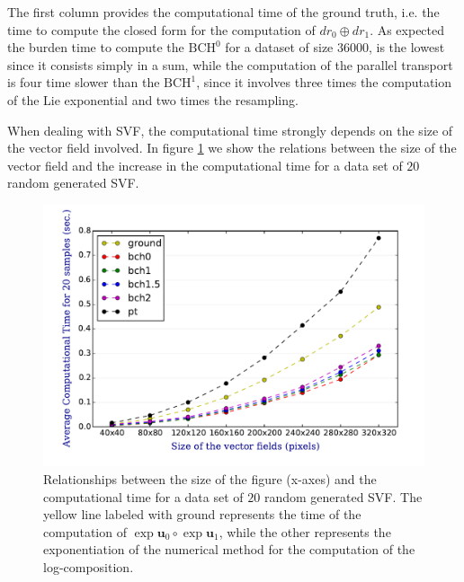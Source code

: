 The first column provides the computational time of the ground truth, i.e. the time to compute the closed form for the computation of $dr_0 \oplus dr_{1}$. As expected the burden time to compute the $\text{BCH}^0$ for a dataset of size $36000$, is the lowest since it consists simply in a sum, while the computation of the parallel transport is four time slower than the $\text{BCH}^1$, since it involves three times the computation of the Lie exponential and two times the resampling.

When dealing with SVF, the computational time strongly depends on the size of the vector field involved. In figure \ref{fig:svf_computational_time} we show the relations between the size of the vector field and the increase in the computational time for a data set of $20$ random generated SVF.

\begin{figure}[!ht]
	\includegraphics[scale=0.7]{figures/svf_computational_time.pdf}
	\caption{Relationships between the size of the figure (x-axes) and the computational time for a data set of $20$ random generated SVF. The yellow line labeled with ground represents the time of the computation of $\exp{\mathbf{u}_0}\circ \exp{\mathbf{u}_1}$, while the other represents the exponentiation of the numerical method for the computation of the log-composition.}
	\label{fig:svf_computational_time}
\end{figure}










